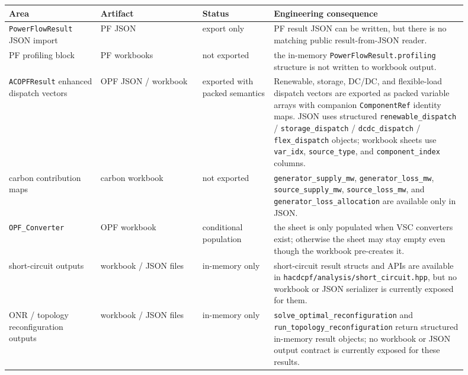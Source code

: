 \begin{longtable}{@{}L{0.18\linewidth}L{0.20\linewidth}L{0.14\linewidth}L{0.38\linewidth}@{}}
\toprule
Area & Artifact & Status & Engineering consequence \\
\midrule
\endhead
\texttt{PowerFlowResult} JSON import & PF JSON & export only & PF result JSON can be written, but there is no matching public result-from-JSON reader. \\
PF profiling block & PF workbooks & not exported & the in-memory \texttt{PowerFlowResult.profiling} structure is not written to workbook output. \\
\texttt{ACOPFResult} enhanced dispatch vectors & OPF JSON / workbook & exported with packed semantics & Renewable, storage, DC/DC, and flexible-load dispatch vectors are exported as packed variable arrays with companion \texttt{ComponentRef} identity maps.  JSON uses structured \texttt{renewable\_dispatch} / \texttt{storage\_dispatch} / \texttt{dcdc\_dispatch} / \texttt{flex\_dispatch} objects; workbook sheets use \texttt{var\_idx}, \texttt{source\_type}, and \texttt{component\_index} columns. \\
carbon contribution maps & carbon workbook & not exported & \texttt{generator\_supply\_mw}, \texttt{generator\_loss\_mw}, \texttt{source\_supply\_mw}, \texttt{source\_loss\_mw}, and \texttt{generator\_loss\_allocation} are available only in JSON. \\
\texttt{OPF\_Converter} & OPF workbook & conditional population & the sheet is only populated when VSC converters exist; otherwise the sheet may stay empty even though the workbook pre-creates it. \\
short-circuit outputs & workbook / JSON files & in-memory only & short-circuit result structs and APIs are available in \texttt{hacdcpf/analysis/short\_circuit.hpp}, but no workbook or JSON serializer is currently exposed for them. \\
ONR / topology reconfiguration outputs & workbook / JSON files & in-memory only & \texttt{solve\_optimal\_reconfiguration} and \texttt{run\_topology\_reconfiguration} return structured in-memory result objects; no workbook or JSON output contract is currently exposed for these results. \\
\bottomrule
\end{longtable}

\normalsize

